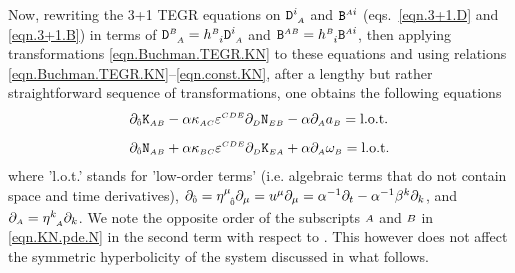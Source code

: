 \documentclass[
10pt, %
a4paper, %
oneside, %
twocolumn,
headinclude,footinclude, %
BCOR5mm, %
]{scrartcl}
\newcommand{\sA}{\mathsmaller A}
\newcommand{\sB}{\mathsmaller B}
\newcommand{\sC}{\mathsmaller C}
\newcommand{\sD}{\mathsmaller D}
\newcommand{\sE}{\mathsmaller E}
\newcommand{\pd}[1]{\partial_{#1}}
\newcommand{\mg}[1]{\kappa_{#1}}			%
\newcommand{\tetrsymbol}{h}
\newcommand{\itetrsymbol}{\eta}
\newcommand{\itetr}[2]{\itetrsymbol^{#1}_{\phantom{#1}#2}}
\newcommand{\tetr}[2]{\tetrsymbol^{#1}_{\phantom{#1}#2}}
\newcommand{\Dfin}[2]{\mathtt{D}_{\phantom{#2}#1}^{#2}}	%
\newcommand{\Kbuch}[2]{\mathtt{K}_{{#1}{#2}}}	%
\newcommand{\Nbuchdown}[2]{\mathtt{N}_{#1#2}}	%
\newcommand{\Bfin}[2]{\mathtt{B}^{#1#2}}	%
\newcommand{\LCtens}{\varepsilon} %
\newcommand{\indalg}[1]{\hat{\mathsmaller{#1}}}
\newcommand{\lapse}{\alpha}
\newcommand{\shift}[1]{\beta^{#1}}
\begin{document}
	
	
	
	
	Now, rewriting the 3+1 TEGR equations on $\Dfin{\sA}{i}$ and $\Bfin{\sA}{i}$
	(eqs.~\eqref{eqn.3+1.D} and \eqref{eqn.3+1.B}) in terms of $\Dfin{\sA}{\sB}
	= \tetr{\sB}{i}\Dfin{\sA}{i}$ and $\Bfin{\sA}{\sB} =
	\tetr{\sB}{i}\Bfin{\sA}{i}$, then applying transformations
	\eqref{eqn.Buchman.TEGR.KN} to these equations and using relations
	\eqref{eqn.Buchman.TEGR.KN}--\eqref{eqn.const.KN}, after a lengthy but
	rather straightforward sequence of transformations, one obtains the following equations
	\begin{subequations}\label{eqn.KN.pde}
		\begin{align}
			\pd{\indalg{0}} \Kbuch{\sA}{\sB}
			&
			- \alpha \mg{\sA\sC}\LCtens^{\sC\sD\sE} \pd{\sD} \Nbuchdown{\sE}{\sB}
			- \alpha \pd{\sA} a_{\sB} = \text{l.o.t.}
			\\[2mm]
			\pd{\indalg{0}} \Nbuchdown{\sA}{\sB}
			&
			+ \alpha \mg{\sB\sC}\LCtens^{\sC\sD\sE} \pd{\sD} \Kbuch{\sE}{\sA}
			+ \alpha \pd{\sA} \omega_{\sB} = \text{l.o.t.}
			\label{eqn.KN.pde.N}
		\end{align}
	\end{subequations}
	where 'l.o.t.' stands for 'low-order terms' (i.e. algebraic terms that do
	not contain space and time derivatives), $ \pd{\indalg{0}} =
	\itetr{\mu}{\indalg{0}}\pd{\mu} = u^\mu\pd{\mu} = \lapse^{-1}\pd{t} -
	\lapse^{-1}\shift{k}\pd{k}$, and $ \pd{\sA} = \itetr{k}{\sA}\pd{k} $. 
	We note the opposite order of the subscripts $\sA$ and $\sB$ in \eqref{eqn.KN.pde.N} in the second term with respect to \cite[eq.(40)]{Buchman2003}. This however does not affect the symmetric hyperbolicity of the system discussed in what follows.
\end{document}
